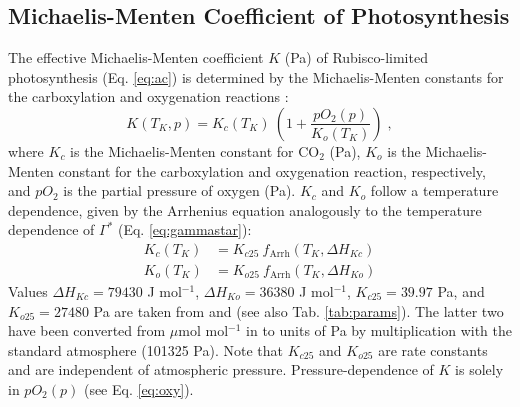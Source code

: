 \documentclass{myreport}
\begin{document}
\subsection{Michaelis-Menten Coefficient of Photosynthesis}
\label{sec:kmm}
The effective Michaelis-Menten coefficient $K$ (Pa) of Rubisco-limited photosynthesis (Eq. \ref{eq:ac}) is determined by the Michaelis-Menten constants for the carboxylation and oxygenation reactions \citep{farquhar80}:
\begin{equation}
\label{eq:michaelis}
  K(T_K, p) = K_c(T_K)\: \left( 1 + \frac{pO_2(p)}{K_o(T_K)} \right) \;,
\end{equation}
where $K_c$ is the Michaelis-Menten constant for CO$_2$ (Pa), $K_o$ is the Michaelis-Menten constant for the carboxylation and oxygenation reaction, respectively, and $pO_2$ is the partial pressure of oxygen (Pa). $K_c$ and $K_o$ follow a temperature dependence, given by the Arrhenius equation analogously to the temperature dependence of $\Gamma^\ast$ (Eq. \ref{eq:gammastar}):
\begin{subequations}
\label{eq:kcko}
\begin{align}
  K_c(T_K)& = K_{c25}\: f_{\text{Arrh}}(T_K, \Delta H_{Kc}) \label{eq:kc} \\
    K_o(T_K)& = K_{o25}\: f_{\text{Arrh}}(T_K, \Delta H_{Ko}) \label{eq:ko}
\end{align}
\end{subequations}
Values $\Delta H_{Kc} = 79430$ J mol$^{-1}$, $\Delta H_{Ko} = 36380$ J mol$^{-1}$, $K_{c25} = 39.97$ Pa, and $K_{o25} = 27480$ Pa are taken from \citet{bernacchi01} and (see also Tab. \ref{tab:params}). The latter two have been converted from $\mu$mol mol$^{-1}$ in \citet{bernacchi01} to units of Pa by multiplication with the standard atmosphere (101325 Pa). Note that $K_{c25}$ and $K_{o25}$ are rate constants and are independent of atmospheric pressure. Pressure-dependence of $K$ is solely in $pO_2(p)$ (see Eq. \ref{eq:oxy}).

\end{document}
